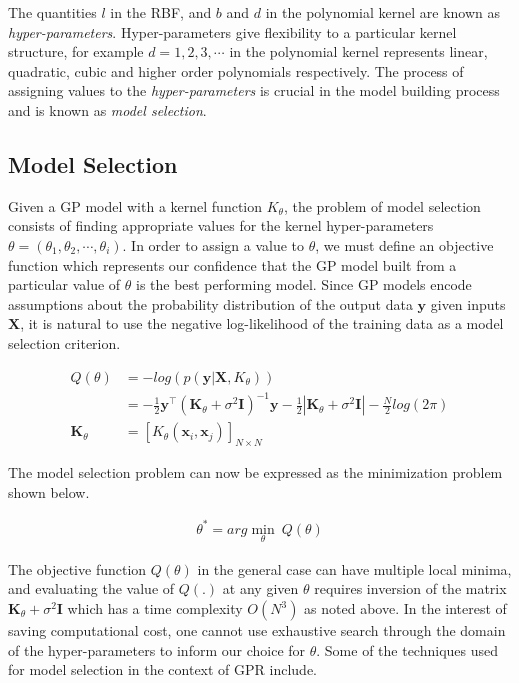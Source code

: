 The quantities $l$ in the RBF, and $b$ and $d$ in the polynomial kernel are known as \emph{hyper-parameters}. Hyper-parameters give flexibility to a particular kernel structure, for example $d = 1, 2, 3, \cdots$ in the polynomial kernel represents linear, quadratic, cubic and higher order polynomials respectively. The process of assigning values to the \emph{hyper-parameters} is crucial in the model building process and is known as \emph{model selection}. 

\subsection{Model Selection}

Given a GP model with a kernel function $K_\theta$, the problem of model selection consists of finding appropriate values for the kernel hyper-parameters $\theta = \left(\theta_1, \theta_2, \cdots, \theta_i\right)$. In order to assign a value to $\theta$, we must define an objective function which represents our confidence that the GP model built from a particular value of $\theta$ is the best performing model. Since GP models encode assumptions about the probability distribution of the output data $\mathbf{y}$ given inputs $\mathbf{X}$, it is natural to use the negative log-likelihood of the training data as a model selection criterion. 

\begin{align*}
  Q(\theta) & = - log(p(\mathbf{y}|\mathbf{X}, K_\theta)) \\
            & = -\frac{1}{2} \mathbf{y}^\intercal (\mathbf{K}_\theta + \sigma^{2} \mathbf{I})^{-1} \mathbf{y} - \frac{1}{2}|\mathbf{K}_\theta + \sigma^{2} \mathbf{I}| - \frac{N}{2}log(2\pi) \\
  \mathbf{K}_\theta & = [K_{\theta}(\mathbf{x}_i, \mathbf{x}_j)]_{N \times N}
\end{align*}

The model selection problem can now be expressed as the minimization problem shown below.

\begin{align*}
\theta^* = arg\min_{\theta} \ Q(\theta)
\end{align*}

The objective function $Q(\theta)$ in the general case can have multiple local minima, and evaluating the value of $Q(.)$ at any given $\theta$ requires inversion of the matrix $\mathbf{K}_\theta + \sigma^{2} \mathbf{I}$ which has a time complexity $O(N^3)$ as noted above. In the interest of saving computational cost, one cannot use exhaustive search through the domain of the hyper-parameters to inform our choice for $\theta$. Some of the techniques used for model selection in the context of GPR include.

